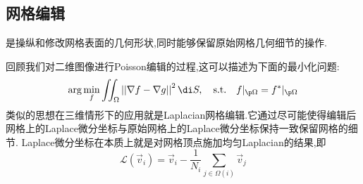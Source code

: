 \documentclass{ctexart}
\begin{document}
\subsection{网格编辑}
\begin{definition}[网格编辑]
    是操纵和修改网格表面的几何形状,同时能够保留原始网格几何细节的操作.
\end{definition}
回顾我们对二维图像进行Poisson编辑的过程,这可以描述为下面的最小化问题:
\[\arg\min_{f}\iint_{\Omega}\left|\left|\nabla f-\nabla g\right|\right|^2\di S,\quad\text{s.t.}\quad f|_{\p\Omega}=f^\ast|_{\p\Omega}\]
类似的思想在三维情形下的应用就是Laplacian网格编辑.它通过尽可能使得编辑后网格上的Laplace微分坐标与原始网格上的Laplace微分坐标保持一致保留网格的细节. Laplace微分坐标在本质上就是对网格顶点施加均匀Laplacian的结果,即
\[\mathcal{L}\left(\vec{v}_i\right)=\vec{v}_i-\dfrac{1}{N_i}\sum_{j\in\Omega(i)}\vec{v}_j\]
\end{document}
